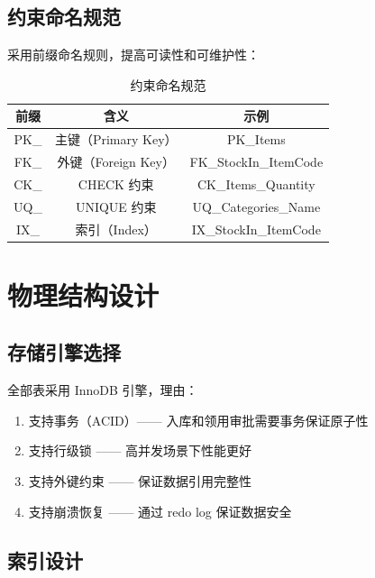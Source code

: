 \documentclass[12pt,a4paper]{ctexart}
\begin{document}
\subsection{约束命名规范}

采用前缀命名规则，提高可读性和可维护性：

\begin{table}[H]
\centering
\begin{tabular}{c|c|c}
\toprule
\textbf{前缀} & \textbf{含义} & \textbf{示例} \\
\midrule
PK\_ & 主键（Primary Key） & PK\_Items \\
FK\_ & 外键（Foreign Key） & FK\_StockIn\_ItemCode \\
CK\_ & CHECK 约束 & CK\_Items\_Quantity \\
UQ\_ & UNIQUE 约束 & UQ\_Categories\_Name \\
IX\_ & 索引（Index） & IX\_StockIn\_ItemCode \\
\bottomrule
\end{tabular}
\caption{约束命名规范}
\end{table}

\section{物理结构设计}

\subsection{存储引擎选择}

全部表采用 InnoDB 引擎，理由：

\begin{enumerate}
    \item 支持事务（ACID）—— 入库和领用审批需要事务保证原子性
    \item 支持行级锁 —— 高并发场景下性能更好
    \item 支持外键约束 —— 保证数据引用完整性
    \item 支持崩溃恢复 —— 通过 redo log 保证数据安全
\end{enumerate}

\subsection{索引设计}
\end{document}
